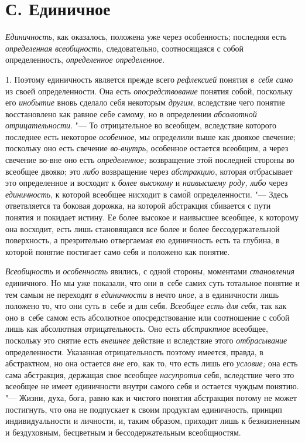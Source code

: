 \section[С. Единичное]{С. Единичное}

{\em Единичность}, как оказалось, положена уже через особенность; последняя
есть {\em определенная всеобщность}, следовательно, соотносящаяся с собой
определенность, {\em определенное определенное}.

1. Поэтому единичность является прежде всего {\em рефлексией} понятия
{\em в~себя само} из своей определенности. Она есть {\em опосредствование}
понятия собой, поскольку его {\em инобытие} вновь сделало себя некоторым
{\em другим}, вследствие чего понятие восстановлено как равное себе самому,
но в определении {\em абсолютной отрицательности}. "--- То отрицательное во
всеобщем, вследствие которого последнее есть некоторое {\em особенное}, мы
определили выше
как двоякое свечение; поскольку оно есть свечение {\em во-внутрь},
особенное остается всеобщим, а через свечение во-вне оно есть
{\em определенное;} возвращение этой последней стороны во всеобщее двояко; это
{\em либо} возвращение через {\em абстракцию},
которая отбрасывает это определенное и восходит к {\em более высокому} и
{\em наивысшему роду, либо} через {\em единичность}, к
которой всеобщее нисходит в сам\'{о}й определенности. "--- Здесь
ответвляется та боковая дорожка, на которой абстракция сбивается с пути
понятия и покидает истину. Ее более высокое и наивысшее всеобщее, к
которому она восходит, есть лишь становящаяся все более и более
бессодержательной поверхность, а презрительно отвергаемая ею единичность
есть та глубина, в которой понятие постигает само себя и положено как понятие.

{\em Всеобщность} и {\em особенность} явились, с одной стороны, моментами
{\em становления} единичного. Но мы уже показали, что они в~себе самих суть
тотальное понятие и тем самым не переходят {\em в единичности} в
нечто {\em иное}, а в единичности лишь положено то, что они суть
в~себе и для себя. {\em Всеобщее есть для себя},
так как оно в~себе самом есть абсолютное опосредствование или
соотношение с собой лишь как абсолютная отрицательность. Оно есть
{\em абстрактное} всеобщее, поскольку это снятие есть {\em внешнее} действие
и вследствие этого {\em отбрасывание}
определенности. Указанная отрицательность поэтому имеется,
правда, в абстрактном, но она остается {\em вне} его, как то,
что есть лишь его {\em условие;}
она есть сама абстракция, держащая свое всеобщее {\em насупротив} себя,
вследствие чего это всеобщее не имеет единичности внутри самого себя и
остается чуждым понятию. "--- Жизни, духа, бога, равно как и
чистого понятия абстракция потому не может постигнуть, что она не
подпускает к своим продуктам единичность, принцип индивидуальности и
личности, и, таким образом, приходит лишь к безжизненным и бездуховным,
бесцветным и бессодержательным всеобщностям.

